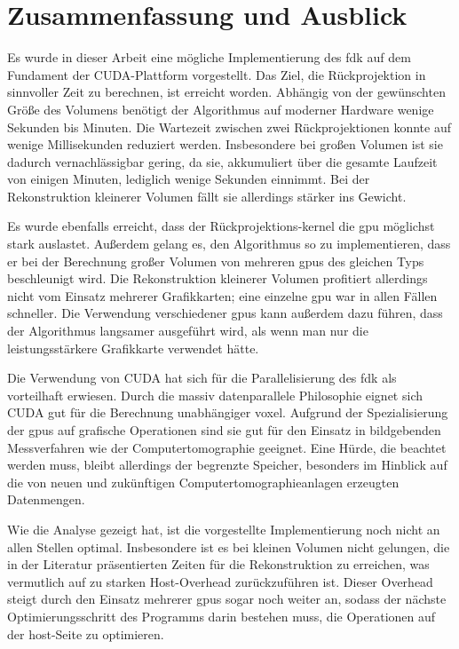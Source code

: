\chapter{Zusammenfassung und Ausblick}

Es wurde in dieser Arbeit eine mögliche Implementierung des \gls{fdk} auf dem Fundament der CUDA-Plattform vorgestellt.
Das Ziel, die Rückprojektion in sinnvoller Zeit zu berechnen, ist erreicht worden. Abhängig von der gewünschten Größe
des Volumens benötigt der Algorithmus auf moderner Hardware wenige Sekunden bis Minuten. Die Wartezeit zwischen zwei
Rückprojektionen konnte auf wenige Millisekunden reduziert werden. Insbesondere bei großen Volumen ist sie dadurch
vernachlässigbar gering, da sie, akkumuliert über die gesamte Laufzeit von einigen Minuten, lediglich wenige Sekunden
einnimmt. Bei der Rekonstruktion kleinerer Volumen fällt sie allerdings stärker ins Gewicht.

Es wurde ebenfalls erreicht, dass der Rückprojektions-\gls{kernel} die \gls{gpu} möglichst stark auslastet. Außerdem
gelang es, den Algorithmus so zu implementieren, dass er bei der Berechnung großer Volumen von mehreren \gls{gpu}s des
gleichen Typs beschleunigt wird. Die Rekonstruktion kleinerer Volumen profitiert allerdings nicht vom Einsatz mehrerer
Grafikkarten; eine einzelne \gls{gpu} war in allen Fällen schneller. Die Verwendung verschiedener \gls{gpu}s kann
außerdem dazu führen, dass der Algorithmus langsamer ausgeführt wird, als wenn man nur die leistungsstärkere Grafikkarte
verwendet hätte.

Die Verwendung von CUDA hat sich für die Parallelisierung des \gls{fdk} als vorteilhaft erwiesen. Durch die massiv
datenparallele Philosophie eignet sich CUDA gut für die Berechnung unabhängiger \gls{voxel}. Aufgrund der
Spezialisierung der \gls{gpu}s auf grafische Operationen sind sie gut für den Einsatz in bildgebenden Messverfahren wie
der Computertomographie geeignet. Eine Hürde, die beachtet werden muss, bleibt allerdings der begrenzte Speicher,
besonders im Hinblick auf die von neuen und zukünftigen Computertomographieanlagen erzeugten Datenmengen.

Wie die Analyse gezeigt hat, ist die vorgestellte Implementierung noch nicht an allen Stellen optimal. Insbesondere ist
es bei kleinen Volumen nicht gelungen, die in der Literatur präsentierten Zeiten für die Rekonstruktion zu erreichen,
was vermutlich auf zu starken Host-Overhead zurückzuführen ist. Dieser Overhead steigt durch den Einsatz mehrerer
\gls{gpu}s sogar noch weiter an, sodass der nächste Optimierungsschritt des Programms darin bestehen muss, die
Operationen auf der \gls{host}-Seite zu optimieren.

